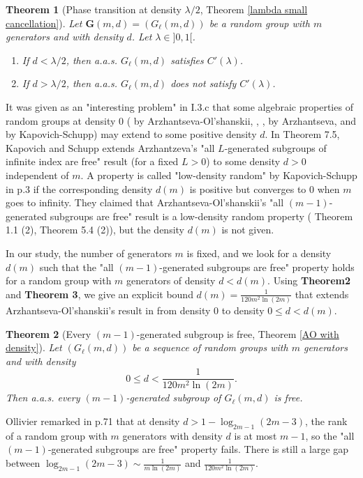 \documentclass{article}
\newcommand{\bs}{\boldsymbol}
\newtheorem{thmm}{Theorem}
\theoremstyle{remark}
\begin{document}
\begin{thmm}[Phase transition at density $\lambda/2$, Theorem \ref{lambda small cancellation}] Let $\bs G(m,d) = (G_\ell(m,d))$ be a random group with $m$ generators and with density $d$. Let $\lambda\in ]0,1[$.
\begin{enumerate}
    \item If $d<\lambda/2$, then a.a.s. $G_\ell(m,d)$ satisfies $C'(\lambda)$.
    \item If $d>\lambda/2$, then a.a.s. $G_\ell(m,d)$ does not satisfy $C'(\lambda)$.
\end{enumerate}
\end{thmm}\quad

It was given as an "interesting problem" in \cite{Oll05} I.3.c that some algebraic properties of random groups at density $0$ (\cite{AO96} by Arzhantseva-Ol'shanskii, \cite{Arz97}, \cite{Arz98}, \cite{Arz00} by Arzhantseva, and \cite{KS05} by Kapovich-Schupp) may extend to some positive density $d$. In \cite{KS08} Theorem 7.5, Kapovich and Schupp extends Arzhantzeva's "all $L$-generated subgroups of infinite index are free" result \cite{Arz97} (for a fixed $L>0$) to some density $d>0$ independent of $m$. A property is called "low-density random" by Kapovich-Schupp in \cite{KS08} p.3 if the corresponding density $d(m)$ is positive but converges to $0$ when $m$ goes to infinity. They claimed that Arzhantseva-Ol'shanskii's "all $(m-1)$-generated subgroups are free" result \cite{AO96} is a low-density random property (\cite{KS08} Theorem 1.1 (2), Theorem 5.4 (2)), but the density $d(m)$ is not given.

In our study, the number of generators $m$ is fixed, and we look for a density $d(m)$ such that the "all $(m-1)$-generated subgroups are free" property holds for a random group with $m$ generators of density $d<d(m)$. Using \textbf{Theorem2} and \textbf{Theorem 3}, we give an explicit bound $d(m)=\frac{1}{120m^2\ln(2m)}$ that extends Arzhantseva-Ol'shanskii's result in \cite{AO96} from density $0$ to density $0 \leq d < d(m)$.
    


\begin{thmm}[Every $(m-1)$-generated subgroup is free, Theorem \ref{AO with density}]
Let $(G_\ell(m,d))$ be a sequence of random groups with $m$ generators and with density \[0\leq d<\frac{1}{120m^2\ln(2m)}.\] 
Then a.a.s. every $(m-1)$-generated subgroup of $G_\ell(m,d)$ is free.
\end{thmm}

Ollivier remarked in \cite{Oll05} p.71 that at density $d>1-\log_{2m-1}(2m-3)$, the rank of a random group with $m$ generators with density $d$ is at most $m-1$, so the "all $(m-1)$-generated subgroups are free" property fails. There is still a large gap between $\log_{2m-1}(2m-3) \sim \frac{1}{m\ln(2m)}$ and $\frac{1}{120m^2\ln(2m)}$.\\[1em]
\end{document}
